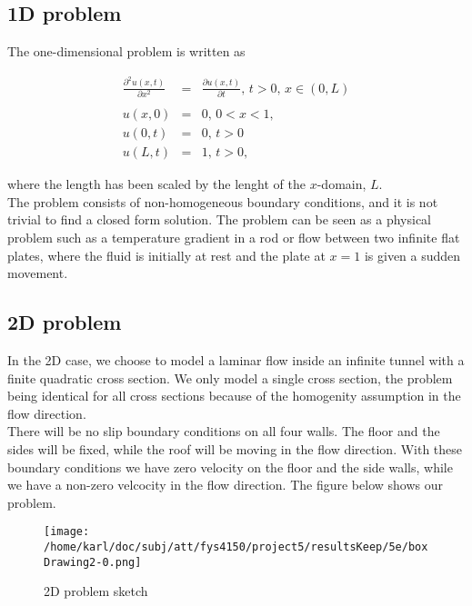 \documentclass{article}
\begin{document}
\subsection{1D problem}
The one-dimensional problem is written as 

\begin{subequations}
	\begin{eqnarray}
	\frac{\partial^2 u(x,t)}{\partial x^2} &=& \frac{\partial u(x,t)}{\partial t} \textit{, } t> 0 \textit{, } x \in (0,L) \\ \nonumber
	\\
	u(x,0) &=& 0 \textit{, } 0 <x < 1 \textit{,} \\
	u(0,t) &=& 0 \textit{, } t>0 \\
	u(L,t) &=& 1 \textit{, } t>0,
	\end{eqnarray}
\end{subequations}

where the length has been scaled by the lenght of the $x$-domain, $L$.\\

The problem consists of non-homogeneous boundary conditions, and it is not trivial to find a closed form solution. The problem can be seen as a physical problem such as a temperature gradient in a rod or flow between two infinite flat plates, where the fluid is initially at rest and the plate at $x=1$ is given a sudden movement. 

\subsection{2D problem}
In the 2D case, we choose to model a laminar flow inside an infinite tunnel with a finite quadratic cross section. We only model a single cross section, the problem being identical for all cross sections because of the homogenity assumption in the flow direction. \\

There will be no slip boundary conditions on all four walls. The floor and the sides will be fixed, while the roof will be moving in the flow direction. With these boundary conditions we have zero velocity on the floor and the side walls, while we have a non-zero velcocity in the flow direction. The figure below shows our problem.

\begin{figure}[H]
	\centering
	\texttt{[image: /home/karl/doc/subj/att/fys4150/project5/resultsKeep/5e/boxDrawing2-0.png]}
	\caption{2D problem sketch}
	\label{1}
\end{figure}
\end{document}

